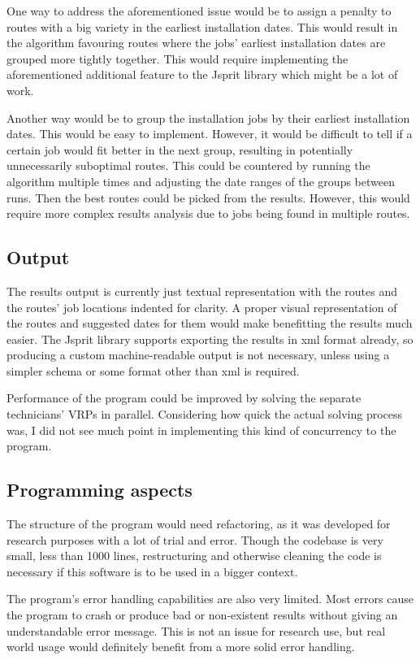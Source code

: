 One way to address the aforementioned issue would be to assign a penalty to routes with a big variety in the earliest installation dates. This would result in the algorithm favouring routes where the jobs' earliest installation dates are grouped more tightly together. This would require implementing the aforementioned additional feature to the Jsprit library which might be a lot of work. 

Another way would be to group the installation jobs by their earliest installation dates. This would be easy to implement. However, it would be difficult to tell if a certain job would fit better in the next group, resulting in potentially unnecessarily suboptimal routes. This could be countered by running the algorithm multiple times and adjusting the date ranges of the groups between runs. Then the best routes could be picked from the results. However, this would require more complex results analysis due to jobs being found in multiple routes. 

\subsection{Output}
The results output is currently just textual representation with the routes and the routes' job locations indented for clarity. A proper visual representation of the routes and suggested dates for them would make benefitting the results much easier. The Jsprit library supports exporting the results in xml format already, so producing a custom machine-readable output is not necessary, unless using a simpler schema or some format other than xml is required.

Performance of the program could be improved by solving the separate technicians' VRPs in parallel. Considering how quick the actual solving process was, I did not see much point in implementing this kind of concurrency to the program. 

\subsection{Programming aspects}
The structure of the program would need refactoring, as it was developed for research purposes with a lot of trial and error. Though the codebase is very small, less than 1000 lines, restructuring and otherwise cleaning the code is necessary if this software is to be used in a bigger context.

The program's error handling capabilities are also very limited. Most errors cause the program to crash or produce bad or non-existent results without giving an understandable error message. This is not an issue for research use, but real world usage would definitely benefit from a more solid error handling. 

